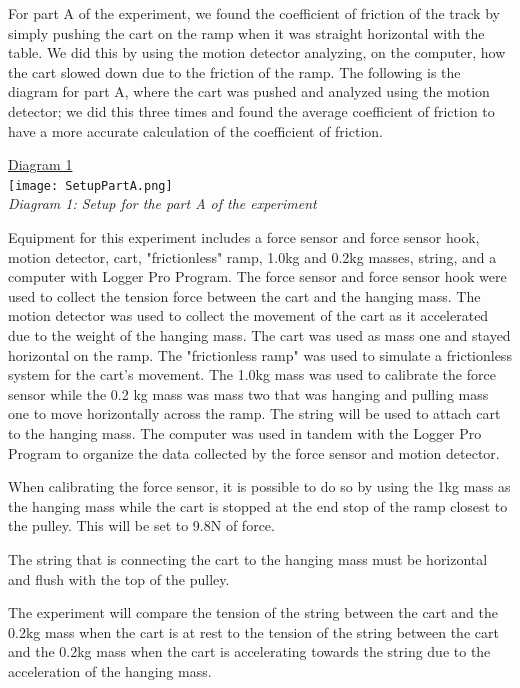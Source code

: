 \documentclass[aps,letterpaper,11pt]{revtex4}
\begin{document}
For part A of the experiment, we found the coefficient of friction of the track by simply pushing the cart on the ramp when it was straight horizontal with the table. We did this by using the motion detector analyzing, on the computer, how the cart slowed down due to the friction of the ramp. The following is the diagram for part A, where the cart was pushed and analyzed using the motion detector; we did this three times and found the average coefficient of friction to have a more accurate calculation of the coefficient of friction.

\begin{center}
\underline{Diagram 1}\\
\texttt{[image: SetupPartA.png]}\\
\textit{Diagram 1: Setup for the part A of the experiment}
\end{center}

Equipment for this experiment includes a force sensor and force sensor hook, motion detector, cart, "frictionless" ramp, 1.0kg and 0.2kg masses, string, and a computer with Logger Pro Program. The force sensor and force sensor hook were used to collect the tension force between the cart and the hanging mass. The motion detector was used to collect the movement of the cart as it accelerated due to the weight of the hanging mass. The cart was used as mass one and stayed horizontal on the ramp. The "frictionless ramp" was used to simulate a frictionless system for the cart's movement. The 1.0kg mass was used to calibrate the force sensor while the 0.2 kg mass was mass two that was hanging and pulling mass one to move horizontally across the ramp. The string will be used to attach cart to the hanging mass. The computer was used in tandem with the Logger Pro Program to organize the data collected by the force sensor and motion detector. 

When calibrating the force sensor, it is possible to do so by using the 1kg mass as the hanging mass while the cart is stopped at the end stop of the ramp closest to the pulley. This will be set to 9.8N of force. 

The string that is connecting the cart to the hanging mass must be horizontal and flush with the top of the pulley.

The experiment will compare the tension of the string between the cart and the 0.2kg mass when the cart is at rest to the tension of the string between the cart and the 0.2kg mass  
when the cart is accelerating towards the string due to the acceleration of the hanging mass. 
\end{document}
